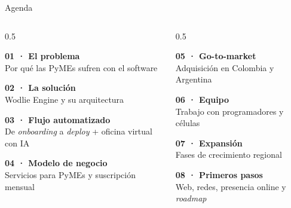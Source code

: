 \documentclass[aspectratio=169,10pt]{beamer}
\begin{document}
\begin{frame}{Agenda}
  \begin{columns}[T]
    \begin{column}{0.5\textwidth}
      \begin{tcolorbox}[wtitle=wink]
        \textbf{01 · El problema}\\ Por qué las PyMEs sufren con el software
      \end{tcolorbox}\vspace{2pt}
      \begin{tcolorbox}[wtitle=wcyan]
        \textbf{02 · La solución}\\ Wodlie Engine y su arquitectura
      \end{tcolorbox}\vspace{2pt}
      \begin{tcolorbox}[wtitle=wmint]
        \textbf{03 · Flujo automatizado}\\ De \textit{onboarding} a \textit{deploy} + oficina virtual con IA
      \end{tcolorbox}\vspace{2pt}
      \begin{tcolorbox}[wtitle=wamber]
        \textbf{04 · Modelo de negocio}\\ Servicios para PyMEs y suscripción mensual
      \end{tcolorbox}
    \end{column}
    \begin{column}{0.5\textwidth}
      \begin{tcolorbox}[wtitle=wrose]
        \textbf{05 · Go-to-market}\\ Adquisición en Colombia y Argentina
      \end{tcolorbox}\vspace{2pt}
      \begin{tcolorbox}[wtitle=wink2]
        \textbf{06 · Equipo}\\ Trabajo con programadores y células
      \end{tcolorbox}\vspace{2pt}
      \begin{tcolorbox}[wtitle=wcyan]
        \textbf{07 · Expansión}\\ Fases de crecimiento regional
      \end{tcolorbox}\vspace{2pt}
      \begin{tcolorbox}[wtitle=wmint]
        \textbf{08 · Primeros pasos}\\ Web, redes, presencia online y \textit{roadmap}
      \end{tcolorbox}
    \end{column}
  \end{columns}
\end{frame}
\end{document}
